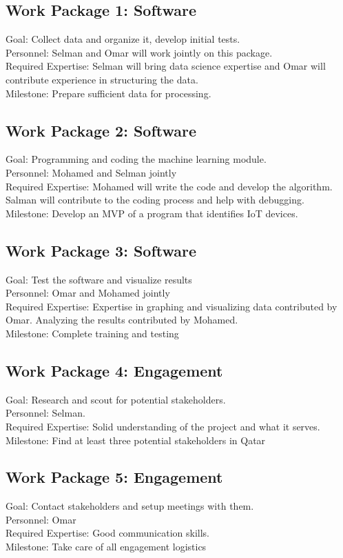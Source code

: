 \documentclass{article}
\begin{document}
\subsection{Work Package 1: Software}
Goal: Collect data and organize it, develop initial tests.\\
Personnel: Selman and Omar will work jointly on this package.\\
Required Expertise: Selman will bring data science expertise and Omar will contribute experience in structuring the data.\\
Milestone: Prepare sufficient data for processing.

\subsection{Work Package 2: Software}
Goal: Programming and coding the machine learning module.\\
Personnel: Mohamed and Selman jointly\\
Required Expertise: Mohamed will write the code and develop the algorithm. Salman will contribute to the coding process and help with debugging.\\
Milestone: Develop an MVP of a program that identifies IoT devices.

\subsection{Work Package 3: Software}
Goal: Test the software and visualize results\\
Personnel: Omar and Mohamed jointly\\
Required Expertise: Expertise in graphing and visualizing data contributed by Omar. Analyzing the results contributed by Mohamed.\\
Milestone: Complete training and testing

\subsection{Work Package 4: Engagement}
Goal: Research and scout for potential stakeholders.\\
Personnel: Selman.\\
Required Expertise: Solid understanding of the project and what it serves.\\
Milestone: Find at least three potential stakeholders in Qatar

\subsection{Work Package 5: Engagement}
Goal: Contact stakeholders and setup meetings with them.\\
Personnel: Omar\\
Required Expertise: Good communication skills.\\
Milestone: Take care of all engagement logistics
\end{document}
